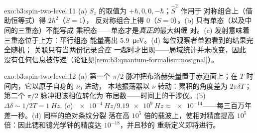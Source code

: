 \begin{solution}{exo:b3:spin-two-level:11}
(a) $S_z$ 的取值为 $+\hbar, 0, 0, -\hbar$；$\hat S^2$ 作用于
对称组合上（借助恒等式）得 $2\hbar^2$（$S = 1$），
反对称组合上得 $0$（$S = 0$）。(b)
只有单态（以及中间的三重态）不能写成
乘积态——单态才是\emph{真正的}最大纠缠
对。(c) 发射意味着三重态位于上方：平行组态
能量高出 \qty{5.9}{\micro eV}。(d)
每位观察者单独看到的结果完全随机；
关联只有当两份记录\emph{合在
一起}时才出现——局域统计并未改变，因此
没有任何信息被传递（论证见\cref{rem:b3:quantum-formalism:nosignal}）。
\end{solution}

\begin{solution}{exo:b3:spin-two-level:12}
(a) 第一个 $\pi/2$ 脉冲把布洛赫矢量置于赤道面上；在
$T$ 时间内，它以原子自身的 $\nu_0$ 进动，
本地振荡器以 $\nu$ 转动：累积的角度差为
$2\pi\delta T$；第二个 $\pi/2$ 脉冲把该相位转化为
布居数——时间上的干涉仪。(b) $\Delta\delta \sim
1/2T = \qty{1}{Hz}$. (c) $\qty{e-4}{Hz}/\qty{9.19e9}{Hz} \approx
\num{e-14}$——每三百万年差一秒。(d) 同样的绝对条纹分裂
落在高 $10^5$ 倍的载波上，使相对精度提高
$10^5$ 倍：因此锶和镱光学钟的精度达
$10^{-18}$，并且秒的
重新定义即将进行。
\end{solution}

